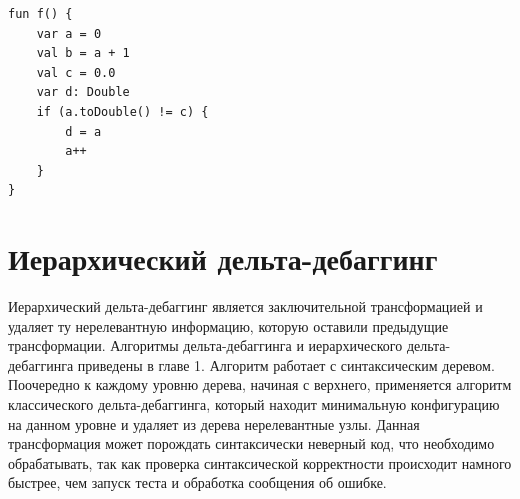 \begin{lstlisting}
fun f() {
    var a = 0
    val b = a + 1
    val c = 0.0
    var d: Double
    if (a.toDouble() != c) {
        d = a
        a++
    }
}
\end{lstlisting}


\section{Иерархический дельта-дебаггинг}
Иерархический дельта-дебаггинг является заключительной трансформацией и удаляет ту нерелевантную информацию, которую оставили предыдущие трансформации. Алгоритмы дельта-дебаггинга и иерархического дельта-дебаггинга приведены в главе 1. Алгоритм работает с синтаксическим деревом. Поочередно к каждому уровню дерева, начиная с верхнего, применяется алгоритм классического дельта-дебаггинга, который находит минимальную конфигурацию на данном уровне и удаляет из дерева нерелевантные узлы. Данная трансформация может порождать синтаксически неверный код, что необходимо обрабатывать, так как проверка синтаксической корректности происходит намного быстрее, чем запуск теста и обработка сообщения об ошибке.